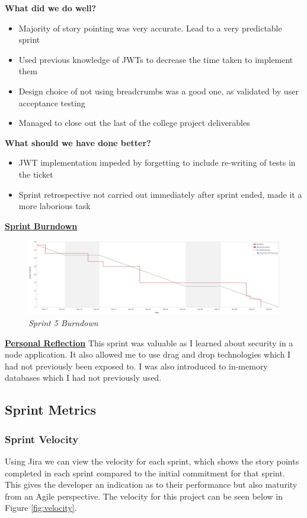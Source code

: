 \textbf{What did we do well?}
\begin{itemize}
	\item Majority of story pointing was very accurate. Lead to a very predictable sprint
	\item Used previous knowledge of JWTs to decrease the time taken to implement them
	\item Design choice of not using breadcrumbs was a good one, as validated by user acceptance testing
	\item Managed to close out the last of the college project deliverables
\end{itemize}
\textbf{What should we have done better?}
\begin{itemize}
	\item JWT implementation impeded by forgetting to include re-writing of tests in the ticket
	\item Sprint retrospective not carried out immediately after sprint ended, made it a more laborious task
\end{itemize}

\underline{\textbf{Sprint Burndown}}\newline
\begin{figure}[!ht]
\centering
\includegraphics*[width=\textwidth]{images/sprint5}
\caption{\em Sprint 5 Burndown}
\label{fig:sprint5}
\end{figure}

\underline{\textbf{Personal Reflection}}\newline
This sprint was valuable as I learned about security in a node application. It also allowed me to use drag and drop technologies which I had not previously been exposed to. I was also introduced to in-memory databases which I had not previously used.

\subsection{Sprint Metrics}

\subsubsection{Sprint Velocity}
Using Jira we can view the velocity for each sprint, which shows the story points completed in each sprint compared to the initial commitment for that sprint. This gives the developer an indication as to their performance but also maturity from an Agile perspective. The velocity for this project can be seen below in Figure \ref{fig:velocity}.

